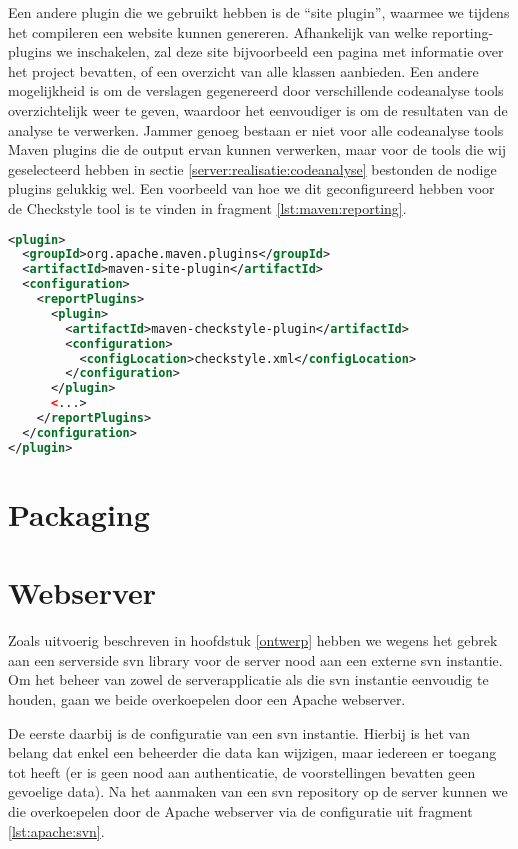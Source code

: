 Een andere plugin die we gebruikt hebben is de ``site plugin'', waarmee we tijdens het compileren een website kunnen genereren. Afhankelijk van welke reporting-plugins we inschakelen, zal deze site bijvoorbeeld een pagina met informatie over het project bevatten, of een overzicht van alle klassen aanbieden. Een andere mogelijkheid is om de verslagen gegenereerd door verschillende codeanalyse tools overzichtelijk weer te geven, waardoor het eenvoudiger is om de resultaten van de analyse te verwerken. Jammer genoeg bestaan er niet voor alle codeanalyse tools Maven plugins die de output ervan kunnen verwerken, maar voor de tools die wij geselecteerd hebben in sectie \ref{server:realisatie:codeanalyse} bestonden de nodige plugins gelukkig wel. Een voorbeeld van hoe we dit geconfigureerd hebben voor de Checkstyle tool is te vinden in fragment \ref{lst:maven:reporting}.

\begin{lstlisting}[language=XML, float, caption=Configuratie van de Maven site plugin voor het genereren van Checkstyle reports., label=lst:maven:reporting]
<plugin>
  <groupId>org.apache.maven.plugins</groupId>
  <artifactId>maven-site-plugin</artifactId>
  <configuration>
    <reportPlugins>
      <plugin>
        <artifactId>maven-checkstyle-plugin</artifactId>
        <configuration>
          <configLocation>checkstyle.xml</configLocation>
        </configuration>
      </plugin>
      <...>
    </reportPlugins>
  </configuration>
</plugin>
\end{lstlisting}
\section{Packaging}


\section{Webserver}

Zoals uitvoerig beschreven in hoofdstuk \ref{ontwerp} hebben we wegens het gebrek aan een serverside \ac{svn} library voor de server nood aan een externe \ac{svn} instantie. Om het beheer van zowel de serverapplicatie als die \ac{svn} instantie eenvoudig te houden, gaan we beide overkoepelen door een Apache webserver.

De eerste daarbij is de configuratie van een \ac{svn} instantie. Hierbij is het van belang dat enkel een beheerder die data kan wijzigen, maar iedereen er toegang tot heeft (er is geen nood aan authenticatie, de voorstellingen bevatten geen gevoelige data). Na het aanmaken van een \ac{svn} repository op de server kunnen we die overkoepelen door de Apache webserver via de configuratie uit fragment \ref{lst:apache:svn}.

